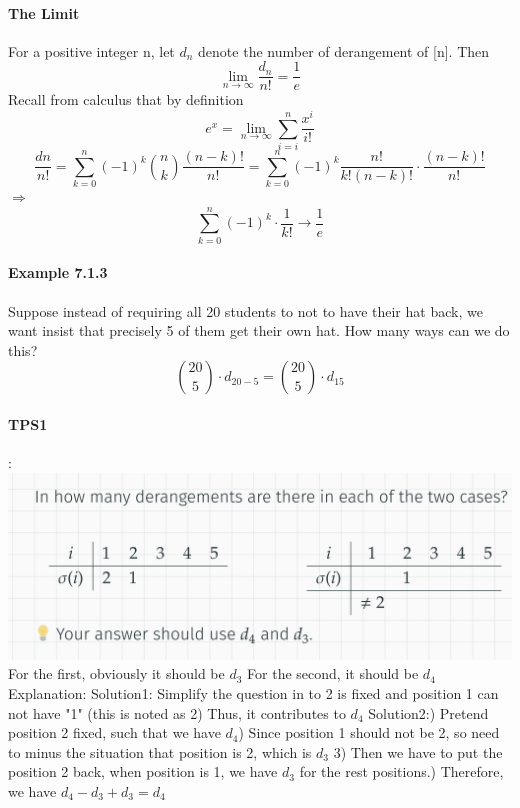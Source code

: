 \documentclass{article}
\begin{document}
\paragraph{The Limit}
For a positive integer n, let $d_n$ denote the number of derangement of [n]. Then
$$\lim_{n\to \infty}\frac{d_n}{n!}=\frac{1}{e}$$
Recall from calculus that by definition
$$e^x=\lim_{n\to \infty} \sum_{i=i}^{n}\frac{x^i}{i!}$$
$$\frac{dn}{n!}=\sum_{k=0}^n(-1)^k\binom{n}{k}\frac{(n-k)!}{n!}=\sum_{k=0}^n(-1)^k\frac{n!}{k!(n-k)!}\cdot \frac{(n-k)!}{n!}$$
$\Longrightarrow$
$$\sum_{k=0}^n(-1)^k\cdot \frac{1}{k!}\to \frac{1}{e}$$
\paragraph{Example 7.1.3}
Suppose instead of requiring all 20 students to not to have their hat back, we want insist that precisely 5 of them get their
own hat.\newline
How many ways can we do this?
$$\binom{20}{5}\cdot d_{20-5}=\binom{20}{5}\cdot d_{15}$$
\paragraph{TPS1}:\newline
\includegraphics{0006}
For the first, obviously it should be $d_3$\newline
For the second, it should be $d_4$\newline
Explanation:\newline
Solution1:\newline
Simplify the question in to 2 is fixed and position 1 can not have "1" (this is noted as 2) \newline
Thus, it contributes to $d_4$\newline
Solution2:) Pretend position 2 fixed, such that we have $d_4$) Since position 1 should not be 2, so need to minus the situation that position is 2, which is $d_3$
3) Then we have to put the position 2 back, when position is 1, we have $d_3$ for the rest positions.) Therefore, we have $d_4-d_3+d_3=d_4$\newline
\end{document}
